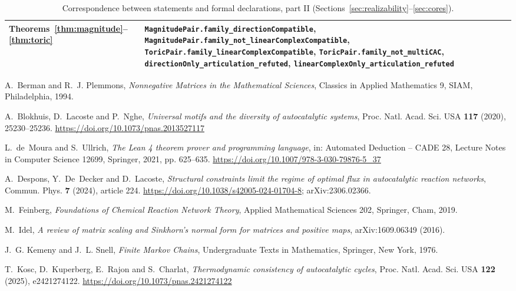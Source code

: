 \documentclass[11pt,reqno]{amsart}
\theoremstyle{plain}
\theoremstyle{definition}
\theoremstyle{remark}
\numberwithin{equation}{section}
\begin{document}
\begin{table}[H]
\begin{tabular}{@{}>{\raggedright\arraybackslash}p{}>{\raggedright\arraybackslash}p{}@{}}
Theorems~\ref{thm:magnitude}--\ref{thm:toric} & \texttt{MagnitudePair.family\_\allowbreak directionCompatible}, \texttt{MagnitudePair.family\_\allowbreak not\_\allowbreak linearComplexCompatible}, \texttt{ToricPair.family\_\allowbreak linearComplexCompatible}, \texttt{ToricPair.family\_\allowbreak not\_\allowbreak multiCAC}, \texttt{directionOnly\_\allowbreak articulation\_\allowbreak refuted}, \texttt{linearComplexOnly\_\allowbreak articulation\_\allowbreak refuted} \\
\bottomrule
\end{tabular}
\caption{Correspondence between statements and formal declarations, part II (Sections~\ref{sec:realizability}--\ref{sec:cores}).}
\label{tab:lean2}
\end{table}

\begin{thebibliography}{99}

A.~Berman and R.~J. Plemmons,
\emph{Nonnegative Matrices in the Mathematical Sciences},
Classics in Applied Mathematics 9, SIAM, Philadelphia, 1994.

A.~Blokhuis, D.~Lacoste and P.~Nghe,
\emph{Universal motifs and the diversity of autocatalytic systems},
Proc. Natl. Acad. Sci. USA \textbf{117} (2020), 25230--25236.
\url{https://doi.org/10.1073/pnas.2013527117}

L.~de~Moura and S.~Ullrich,
\emph{The Lean 4 theorem prover and programming language},
in: Automated Deduction -- CADE 28, Lecture Notes in Computer Science 12699, Springer, 2021, pp. 625--635.
\url{https://doi.org/10.1007/978-3-030-79876-5_37}

A.~Despons, Y.~De~Decker and D.~Lacoste,
\emph{Structural constraints limit the regime of optimal flux in autocatalytic reaction networks},
Commun. Phys. \textbf{7} (2024), article 224.
\url{https://doi.org/10.1038/s42005-024-01704-8}; arXiv:2306.02366.

M.~Feinberg,
\emph{Foundations of Chemical Reaction Network Theory},
Applied Mathematical Sciences 202, Springer, Cham, 2019.

M.~Idel,
\emph{A review of matrix scaling and Sinkhorn's normal form for matrices and positive maps},
arXiv:1609.06349 (2016).

J.~G. Kemeny and J.~L. Snell,
\emph{Finite Markov Chains},
Undergraduate Texts in Mathematics, Springer, New York, 1976.

T.~Kosc, D.~Kuperberg, E.~Rajon and S.~Charlat,
\emph{Thermodynamic consistency of autocatalytic cycles},
Proc. Natl. Acad. Sci. USA \textbf{122} (2025), e2421274122.
\url{https://doi.org/10.1073/pnas.2421274122}


\end{thebibliography}
\end{document}
